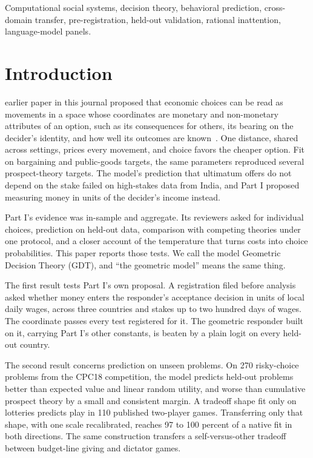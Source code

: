 \documentclass[journal]{IEEEtran}
\begin{document}
\begin{IEEEkeywords}
Computational social systems, decision theory, behavioral prediction, cross-domain transfer, pre-registration, held-out validation, rational inattention, language-model panels.
\end{IEEEkeywords}

\section{Introduction}
\label{sec:intro}

 earlier paper in this journal proposed that economic choices can be read as movements in a space whose coordinates are monetary and non-monetary attributes of an option, such as its consequences for others, its bearing on the decider's identity, and how well its outcomes are known~\cite{bond2026partI}.
One distance, shared across settings, prices every movement, and choice favors the cheaper option.
Fit on bargaining and public-goods targets, the same parameters reproduced several prospect-theory targets.
The model's prediction that ultimatum offers do not depend on the stake failed on high-stakes data from India, and Part I proposed measuring money in units of the decider's income instead.

Part I's evidence was in-sample and aggregate.
Its reviewers asked for individual choices, prediction on held-out data, comparison with competing theories under one protocol, and a closer account of the temperature that turns costs into choice probabilities.
This paper reports those tests.
We call the model Geometric Decision Theory (GDT), and ``the geometric model'' means the same thing.

The first result tests Part I's own proposal.
A registration filed before analysis asked whether money enters the responder's acceptance decision in units of local daily wages, across three countries and stakes up to two hundred days of wages.
The coordinate passes every test registered for it.
The geometric responder built on it, carrying Part I's other constants, is beaten by a plain logit on every held-out country.

The second result concerns prediction on unseen problems.
On 270 risky-choice problems from the CPC18 competition, the model predicts held-out problems better than expected value and linear random utility, and worse than cumulative prospect theory by a small and consistent margin.
A tradeoff shape fit only on lotteries predicts play in 110 published two-player games.
Transferring only that shape, with one scale recalibrated, reaches 97 to 100 percent of a native fit in both directions.
The same construction transfers a self-versus-other tradeoff between budget-line giving and dictator games.
\end{document}
